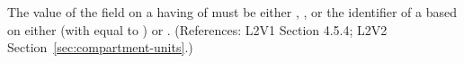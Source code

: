 The value of the  field on a \Compartment having
 of  must be either ,
, or the identifier of a \UnitDefinition based on
either  (with  equal to ) or
.  (References: L2V1 Section 4.5.4; L2V2
Section~\ref{sec:compartment-units}.)
